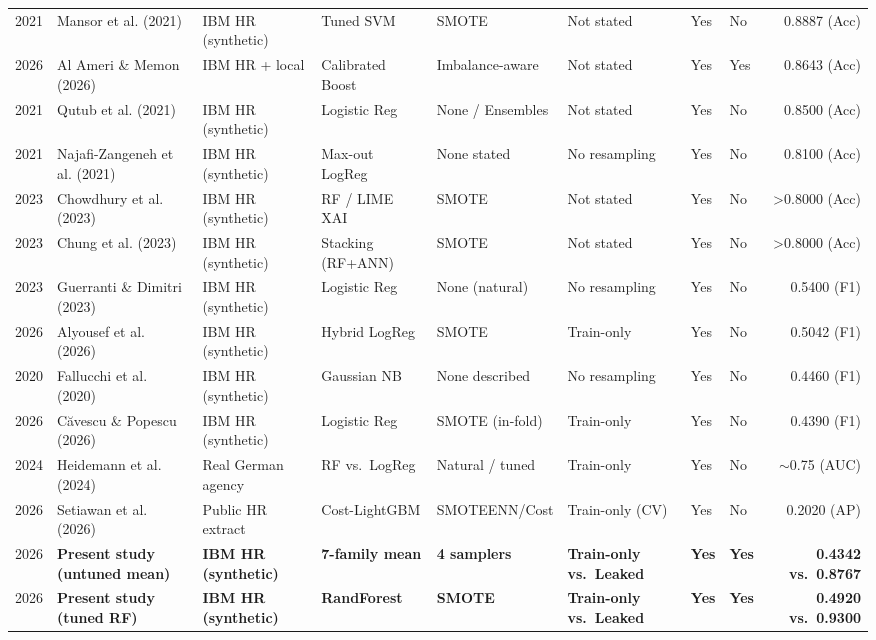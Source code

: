 \documentclass[12pt,a4paper]{article}
\begin{document}
\begin{table}[p]
{\begin{tabular}{@{}rlllllllr@{}}
2021 & Mansor et al. (2021) \parencite{ref70} & IBM HR (synthetic) & Tuned SVM & SMOTE & Not stated & Yes & No & 0.8887 (Acc) \\
2026 & Al Ameri \& Memon (2026) \parencite{ref25} & IBM HR + local & Calibrated Boost & Imbalance-aware & Not stated & Yes & Yes & 0.8643 (Acc) \\
2021 & Qutub et al. (2021) \parencite{ref71} & IBM HR (synthetic) & Logistic Reg & None / Ensembles & Not stated & Yes & No & 0.8500 (Acc) \\
2021 & Najafi-Zangeneh et al. (2021) \parencite{ref69} & IBM HR (synthetic) & Max-out LogReg & None stated & No resampling & Yes & No & 0.8100 (Acc) \\
2023 & Chowdhury et al. (2023) \parencite{ref63} & IBM HR (synthetic) & RF / LIME XAI & SMOTE & Not stated & Yes & No & >0.8000 (Acc) \\
2023 & Chung et al. (2023) \parencite{ref65} & IBM HR (synthetic) & Stacking (RF+ANN) & SMOTE & Not stated & Yes & No & >0.8000 (Acc) \\
\midrule
2023 & Guerranti \& Dimitri (2023) \parencite{ref68} & IBM HR (synthetic) & Logistic Reg & None (natural) & No resampling & Yes & No & 0.5400 (F1) \\
2026 & Alyousef et al. (2026) \parencite{ref16} & IBM HR (synthetic) & Hybrid LogReg & SMOTE & Train-only & Yes & No & 0.5042 (F1) \\
2020 & Fallucchi et al. (2020) \parencite{ref1} & IBM HR (synthetic) & Gaussian NB & None described & No resampling & Yes & No & 0.4460 (F1) \\
2026 & Căvescu \& Popescu (2026) \parencite{ref15} & IBM HR (synthetic) & Logistic Reg & SMOTE (in-fold) & Train-only & Yes & No & 0.4390 (F1) \\
2024 & Heidemann et al. (2024) \parencite{ref64} & Real German agency & RF vs.\ LogReg & Natural / tuned & Train-only & Yes & No & $\sim$0.75 (AUC) \\
2026 & Setiawan et al. (2026) \parencite{ref26} & Public HR extract & Cost-LightGBM & SMOTEENN/Cost & Train-only (CV) & Yes & No & 0.2020 (AP) \\
\midrule
2026 & \textbf{Present study (untuned mean)} & \textbf{IBM HR (synthetic)} & \textbf{7-family mean} & \textbf{4 samplers} & \textbf{Train-only vs.\ Leaked} & \textbf{Yes} & \textbf{Yes} & \textbf{0.4342 vs.\ 0.8767} \\
2026 & \textbf{Present study (tuned RF)} & \textbf{IBM HR (synthetic)} & \textbf{RandForest} & \textbf{SMOTE} & \textbf{Train-only vs.\ Leaked} & \textbf{Yes} & \textbf{Yes} & \textbf{0.4920 vs.\ 0.9300} \\
\bottomrule
\end{tabular}%
}
\end{table}
\clearpage
\end{document}
